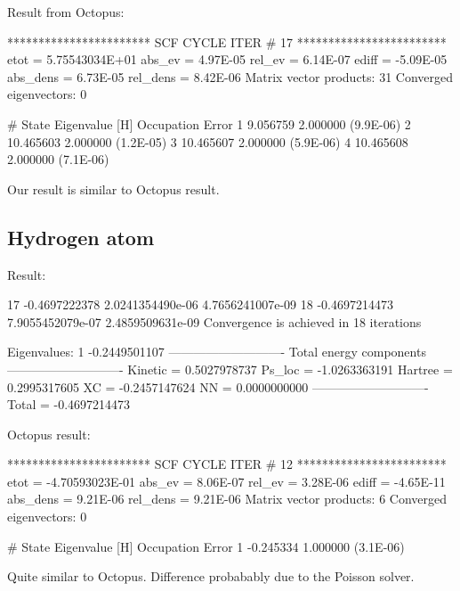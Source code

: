 Result from Octopus:
\begin{fullwidth}
\begin{textcode}
*********************** SCF CYCLE ITER #   17 ************************
 etot  =  5.75543034E+01 abs_ev   =  4.97E-05 rel_ev   =  6.14E-07
 ediff =       -5.09E-05 abs_dens =  6.73E-05 rel_dens =  8.42E-06
Matrix vector products:     31
Converged eigenvectors:      0

#  State  Eigenvalue [H]  Occupation    Error
      1        9.056759    2.000000   (9.9E-06)
      2       10.465603    2.000000   (1.2E-05)
      3       10.465607    2.000000   (5.9E-06)
      4       10.465608    2.000000   (7.1E-06) 
\end{textcode}
\end{fullwidth}

Our result is similar to Octopus result.


\subsection{Hydrogen atom}

Result:
\begin{textcode}
  17      -0.4697222378   2.0241354490e-06   4.7656241007e-09
  18      -0.4697214473   7.9055452079e-07   2.4859509631e-09
Convergence is achieved in 18 iterations

Eigenvalues:
 1      -0.2449501107
----------------------------
Total energy components
----------------------------
Kinetic =       0.5027978737
Ps_loc  =      -1.0263363191
Hartree =       0.2995317605
XC      =      -0.2457147624
NN      =       0.0000000000
----------------------------
Total   =      -0.4697214473
\end{textcode}

Octopus result:
\begin{fullwidth}
\begin{textcode}
*********************** SCF CYCLE ITER #   12 ************************
 etot  = -4.70593023E-01 abs_ev   =  8.06E-07 rel_ev   =  3.28E-06
 ediff =       -4.65E-11 abs_dens =  9.21E-06 rel_dens =  9.21E-06
Matrix vector products:      6
Converged eigenvectors:      0
 
 #  State  Eigenvalue [H]  Occupation    Error
       1       -0.245334    1.000000   (3.1E-06)
\end{textcode}
\end{fullwidth}

Quite similar to Octopus.
Difference probabably due to the Poisson solver.

